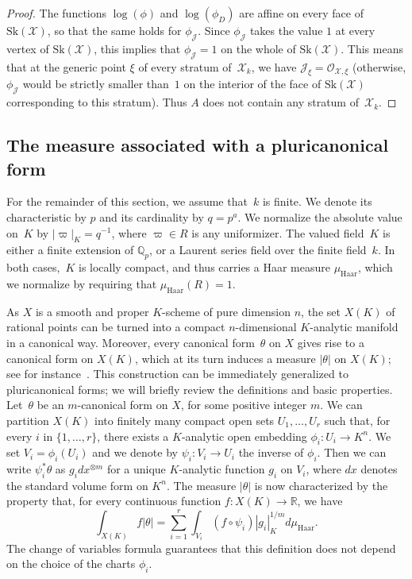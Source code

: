 \documentclass[JEP,XML,SOM,Unicode,NoFloatCountersInSection]{cedram}
\let\mathcal\mathscr
\theoremstyle{definition}
\numberwithin{equation}{subsection}
\newcommand{\Q}{\ensuremath{\mathbb{Q}}}
\newcommand{\R}{\ensuremath{\mathbb{R}}}
\newcommand{\cX}{\ensuremath{\mathscr{X}}}
\newcommand{\Haar}{\mathrm{Haar}}
\newcommand{\Sk}{\mathrm{Sk}}
\let\form\theta
\let\unif\varpi
\begin{document}
\begin{proof}
The functions $\log(\phi)$ and $\log(\phi_D)$ are affine on every face of $\Sk(\cX)$, so that the same holds for $\phi_{\mathscr{J}}$. Since $\phi_{\mathscr{J}}$ takes the value $1$ at every vertex of $\Sk(\cX)$, this implies that $\phi_{\mathscr{J}}=1$ on the whole of $\Sk(\cX)$. This means that at the generic point $\xi$ of every stratum of~$\cX_k$, we have $\mathscr{J}_{\xi}=\mathcal{O}_{\cX,\xi}$ (otherwise, $\phi_{\mathscr{J}}$ would be strictly smaller than~$1$ on the interior of the face of $\Sk(\cX)$ corresponding to this stratum). Thus $A$ does not contain any stratum of~$\cX_k$.
\end{proof}

\subsection{The measure associated with a pluricanonical form}\label{ss:pluri}
For the remainder of this section, we assume that~$k$ is finite. We denote its characteristic by $p$ and its cardinality by $q=p^a$. We normalize the absolute value on~$K$ by $|\unif|_K=q^{-1}$, where $\unif\in R$ is any uniformizer.
The valued field~$K$ is either a finite extension of $\Q_p$, or a Laurent series field over the finite field~$k$. In both cases,~$K$ is locally compact,
and thus carries a Haar measure $\mu_{\Haar}$, which we normalize by requiring that $\mu_{\Haar}(R)=1$.

As $X$ is a smooth and proper $K$\nobreakdash-scheme of pure dimension $n$, the set $X(K)$ of rational points can be turned into a compact $n$-dimensional $K$\nobreakdash-analytic manifold in a canonical way.
Moreover, every canonical form~$\form$ on $X$ gives rise to a canonical form on $X(K)$, which at its turn induces a measure $|\form|$ on $X(K)$; see for instance~\cite[\S1.1]{ChNiSe}. This construction can be immediately generalized to pluricanonical forms; we will briefly review the definitions and basic properties. Let~$\form$ be an $m$-canonical form on $X$, for some positive integer $m$. We can partition $X(K)$ into finitely many compact open sets $U_1,\ldots,U_r$ such that, for every $i$ in $\{1,\ldots,r\}$, there exists a $K$\nobreakdash-analytic open embedding
$\phi_i:U_i\to K^n$. We set $V_i=\phi_i(U_i)$ and we denote by $\psi_i:V_i\to U_i$ the inverse of $\phi_i$. Then we can write $\psi_i^* \form$ as
$g_i dx^{\otimes m}$ for a unique $K$\nobreakdash-analytic function $g_i$ on $V_i$, where $dx$ denotes the standard volume form on $K^n$.
The measure $|\form|$ is now characterized by the property that, for every continuous function $f:X(K)\to \R$, we have
\[
\int_{X(K)} f |\form|=\sum_{i=1}^r \int_{V_i}(f\circ \psi_i)|g_i|^{1/m}_K d\mu_{\Haar}.
\]
The change of variables formula guarantees that this definition does not depend on the choice of the charts $\phi_i$.
\end{document}
